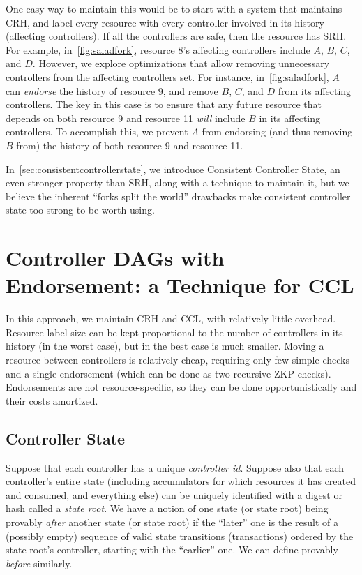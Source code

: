 \documentclass[a4paper,USenglish,cleveref, autoref, thm-restate, anonymous]{lipics-v2021}
\begin{document}

One easy way to maintain this would be to start with a system that maintains CRH, and label every resource with every controller involved in its history (affecting controllers). 
If all the controllers are safe, then the resource has SRH. 
For example, in~\cref{fig:saladfork}, resource 8's affecting controllers include $A$, $B$, $C$, and $D$.
However, we explore optimizations that allow removing unnecessary controllers from the affecting controllers set.
For instance, in~\cref{fig:saladfork}, $A$ can \emph{endorse} the history of resource 9, and remove $B$, $C$, and $D$ from its affecting controllers.
The key in this case is to ensure that any future resource that depends on both resource 9 and resource 11 \emph{will} include $B$ in its affecting controllers.
To accomplish this, we prevent $A$ from endorsing (and thus removing $B$ from) the history of both resource 9 and resource 11.

In~\cref{sec:consistentcontrollerstate}, we introduce Consistent Controller State, an even stronger property than SRH, along with a technique to maintain it, but we believe the inherent ``forks split the world'' drawbacks  make consistent controller state too strong to be worth using.

\section{Controller DAGs with Endorsement: a Technique for CCL}
\label{sec:dagswithendorsement}
In this approach, we maintain CRH and CCL, with relatively little overhead.
Resource label size can be kept proportional to the number of controllers in its history (in the worst case), but in the best case is much smaller.
Moving a resource between controllers is relatively cheap, requiring only few simple checks and a single endorsement (which can be done as two recursive ZKP checks).
Endorsements are not resource-specific, so they can be done opportunistically and their costs amortized. 

\subsection{Controller State}
Suppose that each controller has a unique \emph{controller id}.
Suppose also that each controller's entire state (including accumulators for which resources it has created and consumed, and everything else) can be uniquely identified with a digest or hash called a \emph{state root}.
We have a notion of one state (or state root) being provably \emph{after} another state (or state root) if the ``later'' one is the result of a (possibly empty) sequence of valid state transitions (transactions) ordered by the state root's controller, starting with the ``earlier'' one. 
We can define provably \emph{before} similarly. 
\end{document}

